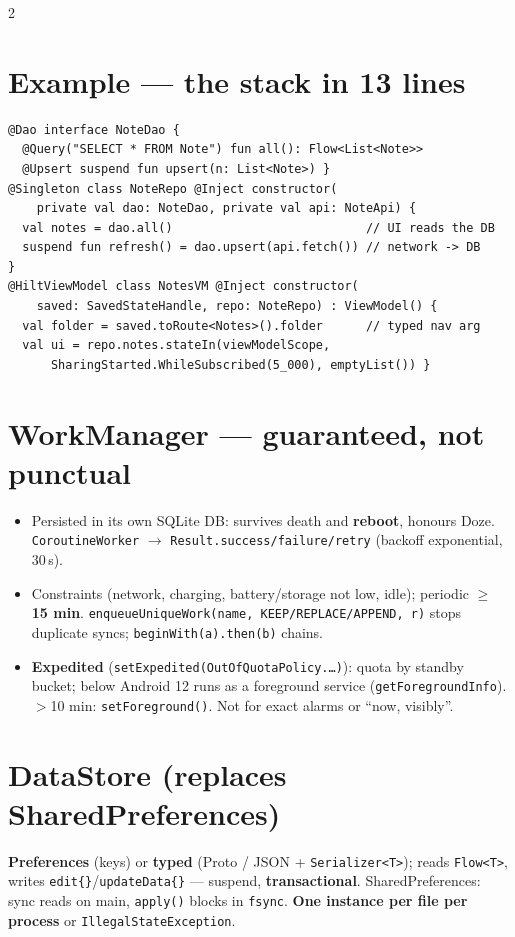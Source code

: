 \documentclass[8pt]{extarticle}
\begin{document}
\begin{multicols}{2}
\section{Example — the stack in 13 lines}
\begin{lstlisting}[language=KotlinSheet]
@Dao interface NoteDao {
  @Query("SELECT * FROM Note") fun all(): Flow<List<Note>>
  @Upsert suspend fun upsert(n: List<Note>) }
@Singleton class NoteRepo @Inject constructor(
    private val dao: NoteDao, private val api: NoteApi) {
  val notes = dao.all()                           // UI reads the DB
  suspend fun refresh() = dao.upsert(api.fetch()) // network -> DB
}
@HiltViewModel class NotesVM @Inject constructor(
    saved: SavedStateHandle, repo: NoteRepo) : ViewModel() {
  val folder = saved.toRoute<Notes>().folder      // typed nav arg
  val ui = repo.notes.stateIn(viewModelScope,
      SharingStarted.WhileSubscribed(5_000), emptyList()) }
\end{lstlisting}

\columnbreak

\section{WorkManager — guaranteed, not punctual}
\begin{itemize}\raggedright
  \item Persisted in its own SQLite DB: survives death and \textbf{reboot}, honours Doze.
        \texttt{CoroutineWorker} $\to$ \texttt{Result.success/failure/retry} (backoff
        exponential, 30\,s).
  \item Constraints (network, charging, battery/storage not low, idle); periodic
        $\geq$ \textbf{15 min}. \texttt{enqueueUniqueWork(name, KEEP/REPLACE/APPEND, r)}
        stops duplicate syncs; \texttt{beginWith(a).then(b)} chains.
  \item \textbf{Expedited} (\texttt{setExpedited(OutOfQuotaPolicy.…)}): quota by standby
        bucket; below Android 12 runs as a foreground service (\texttt{getForegroundInfo}).
        $>$10 min: \texttt{setForeground()}. Not for exact alarms or ``now, visibly''.
\end{itemize}

\section{DataStore (replaces SharedPreferences)}
\raggedright\textbf{Preferences} (keys) or \textbf{typed} (Proto / JSON + \texttt{Serializer<T>}); reads
\texttt{Flow<T>}, writes \texttt{edit\{\}}/\texttt{updateData\{\}} — suspend,
\textbf{transactional}. SharedPreferences: sync reads on main, \texttt{apply()} blocks in
\texttt{fsync}. \textbf{One instance per file per process} or \texttt{IllegalStateException}.


\end{multicols}
\end{document}

